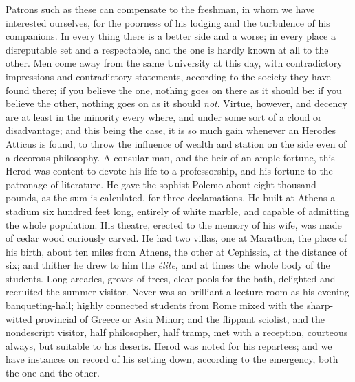 Patrons such as these can compensate to the freshman, in whom we
have interested ourselves, for the poorness of his lodging and the
turbulence of his companions. In every thing there is a better side
and a worse; in every place a disreputable set and a respectable, and
the one is hardly known at all to the other. Men come away from the
same University at this day, with contradictory impressions and
contradictory statements, according to the society they have found
there; if you believe the one, nothing goes on there as it should be:
if you believe the other, nothing goes on as it should \emph{not}.
Virtue, however, and decency are at least in the minority every
where, and under some sort of a cloud or disadvantage; and this being
the case, it is so much gain whenever an Herodes Atticus is found, to
throw the influence of wealth and station on the side even of a
decorous philosophy. A consular man, and the heir of an ample fortune,
this Herod was content to devote his life to a professorship, and his
fortune to the patronage of literature. He gave the sophist Polemo
about eight thousand pounds, as the sum is calculated, for three
declamations. He built at Athens a stadium six hundred feet long,
entirely of white marble, and capable of admitting the whole
population. His theatre, erected to the memory of his wife, was made
of cedar wood curiously carved. He had two villas, one at Marathon,
the place of his birth, about ten miles from Athens, the other at
Cephissia, at the distance of six; and thither he drew to him the \emph{élite},
and at times the whole body of the students. Long arcades, groves of
trees, clear pools for the bath, delighted and recruited the summer
visitor. Never was so brilliant a lecture-room as his evening
banqueting-hall; highly connected students from Rome mixed with the
sharp-witted provincial of Greece or Asia Minor; and the flippant
sciolist, and the nondescript visitor, half philosopher, half tramp,
met with a reception, courteous always, but suitable to his deserts.
Herod was noted for his repartees; and we have instances on record of
his setting down, according to the emergency, both the one and the
other.

